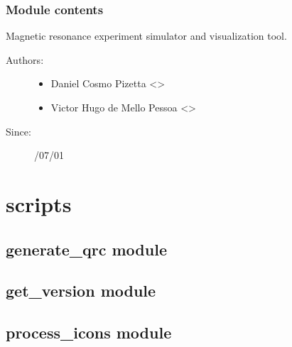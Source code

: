 \documentclass[a4paper,10pt,english]{sphinxmanual}
\begin{document}
\subsubsection{Module contents}
\label{\detokenize{autodoc/mrsprint/mrsprint:module-mrsprint}}\label{\detokenize{autodoc/mrsprint/mrsprint:module-contents}}
Magnetic resonance experiment simulator and visualization tool.
\begin{description}
\item[{Authors:}] \leavevmode\begin{itemize}
\item {} 
Daniel Cosmo Pizetta \textless{}\textgreater{}

\item {} 
Victor Hugo de Mello Pessoa \textless{}\textgreater{}

\end{itemize}

\item[{Since:}] /07/01

\end{description}


\section{scripts}
\label{\detokenize{autodoc/scripts/modules:scripts}}\label{\detokenize{autodoc/scripts/modules::doc}}

\subsection{generate\_qrc module}
\label{\detokenize{autodoc/scripts/generate_qrc:generate-qrc-module}}\label{\detokenize{autodoc/scripts/generate_qrc::doc}}

\subsection{get\_version module}
\label{\detokenize{autodoc/scripts/get_version:get-version-module}}\label{\detokenize{autodoc/scripts/get_version::doc}}

\subsection{process\_icons module}
\label{\detokenize{autodoc/scripts/process_icons:process-icons-module}}\label{\detokenize{autodoc/scripts/process_icons::doc}}
\end{document}
